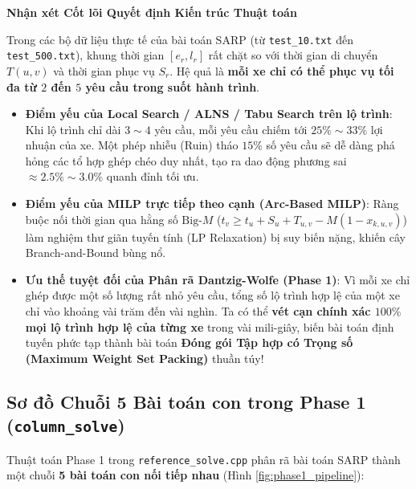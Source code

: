 \documentclass[11pt,a4paper]{article}
\theoremstyle{definition}
\newenvironment{keybox}[1]{%
    \par\medskip\noindent
    \begin{lrbox}{\calloutbox}%
    \begin{minipage}{\dimexpr\linewidth-2\fboxsep-2\fboxrule\relax}
    \textbf{\textcolor{primaryblue}{#1}}\par\smallskip
}{%
    \end{minipage}%
    \end{lrbox}%
    \fcolorbox{primaryblue}{secondaryblue}{\usebox{\calloutbox}}%
    \par\medskip
}
\begin{document}
\begin{keybox}{Nhận xét Cốt lõi Quyết định Kiến trúc Thuật toán}
Trong các bộ dữ liệu thực tế của bài toán SARP (từ \texttt{test\_10.txt} đến \texttt{test\_500.txt}), khung thời gian $[e_r, l_r]$ rất chặt so với thời gian di chuyển $T(u,v)$ và thời gian phục vụ $S_r$. Hệ quả là \textbf{mỗi xe chỉ có thể phục vụ tối đa từ $2$ đến $5$ yêu cầu trong suốt hành trình}.
\begin{itemize}[leftmargin=1.2em]
    \item \textbf{Điểm yếu của Local Search / ALNS / Tabu Search trên lộ trình}: Khi lộ trình chỉ dài $3\sim 4$ yêu cầu, mỗi yêu cầu chiếm tới $25\%\sim 33\%$ lợi nhuận của xe. Một phép nhiễu (Ruin) tháo $15\%$ số yêu cầu sẽ dễ dàng phá hỏng các tổ hợp ghép chéo duy nhất, tạo ra dao động phương sai $\approx 2.5\%\sim 3.0\%$ quanh đỉnh tối ưu.
    \item \textbf{Điểm yếu của MILP trực tiếp theo cạnh (Arc-Based MILP)}: Ràng buộc nối thời gian qua hằng số $\text{Big-}M$ ($t_v \ge t_u + S_u + T_{u,v} - M(1 - x_{k,u,v})$) làm nghiệm thư giãn tuyến tính (LP Relaxation) bị suy biến nặng, khiến cây Branch-and-Bound bùng nổ.
    \item \textbf{Ưu thế tuyệt đối của Phân rã Dantzig-Wolfe (Phase 1)}: Vì mỗi xe chỉ ghép được một số lượng rất nhỏ yêu cầu, tổng số lộ trình hợp lệ của một xe chỉ vào khoảng vài trăm đến vài nghìn. Ta có thể \textbf{vét cạn chính xác $100\%$ mọi lộ trình hợp lệ của từng xe} trong vài mili-giây, biến bài toán định tuyến phức tạp thành bài toán \textbf{Đóng gói Tập hợp có Trọng số (Maximum Weight Set Packing)} thuần túy!
\end{itemize}
\end{keybox}

\subsection{Sơ đồ Chuỗi 5 Bài toán con trong Phase 1 (\texttt{column\_solve})}
Thuật toán Phase 1 trong \texttt{reference\_solve.cpp} phân rã bài toán SARP thành một chuỗi \textbf{5 bài toán con nối tiếp nhau} (Hình \ref{fig:phase1_pipeline}):
\end{document}
